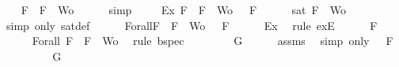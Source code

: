 \begin{isabellebody}
\ \ \isamarkupfalse%
\ {\isachardoublequoteopen}F\ {\isasymin}\ {\isacharbraceleft}F{\isacharbraceright}\ {\isasymunion}\ Wo{\isachardoublequoteclose}\isanewline
\ \ \ \ \isamarkupfalse%
\ simp\ \isanewline
\ \ \isamarkupfalse%
\ Ex{}{\isacharcolon}{\isachardoublequoteopen}{\isasymexists}{\isasymA}{\isachardot}\ {\isasymforall}F\ {\isasymin}\ {\isacharparenleft}{\isacharbraceleft}F{\isacharbraceright}\ {\isasymunion}\ Wo{\isacharparenright}{\isachardot}\ {\isasymA}\ {\isasymTurnstile}\ F{\isachardoublequoteclose}\isanewline
\ \ \ \ \isamarkupfalse%
\ {\isacartoucheopen}sat\ {\isacharparenleft}{\isacharbraceleft}F{\isacharbraceright}\ {\isasymunion}\ Wo{\isacharparenright}{\isacartoucheclose}\ \isamarkupfalse%
\ {\isacharparenleft}simp\ only{\isacharcolon}\ sat{\isacharunderscore}def{\isacharparenright}\isanewline
\ \ \isamarkupfalse%
\ {\isasymA}\ \ Forall{}{\isacharcolon}{\isachardoublequoteopen}{\isasymforall}F\ {\isasymin}\ {\isacharparenleft}{\isacharbraceleft}F{\isacharbraceright}\ {\isasymunion}\ Wo{\isacharparenright}{\isachardot}\ {\isasymA}\ {\isasymTurnstile}\ F{\isachardoublequoteclose}\isanewline
\ \ \ \ \isamarkupfalse%
\ Ex{}\ \isamarkupfalse%
\ {\isacharparenleft}rule\ exE{\isacharparenright}\isanewline
\ \ \isamarkupfalse%
\ {\isachardoublequoteopen}{\isasymA}\ {\isasymTurnstile}\ F{\isachardoublequoteclose}\isanewline
\ \ \ \ \isamarkupfalse%
\ Forall{}\ {\isacartoucheopen}F\ {\isasymin}\ {\isacharbraceleft}F{\isacharbraceright}\ {\isasymunion}\ Wo{\isacartoucheclose}\ \isamarkupfalse%
\ {\isacharparenleft}rule\ bspec{\isacharparenright}\isanewline
\ \ \isamarkupfalse%
\ \isamarkupfalse%
\ {\isachardoublequoteopen}{\isasymA}\ {\isasymTurnstile}\ \isactrlbold {\isasymnot}{\isacharparenleft}\isactrlbold {\isasymnot}\ G{\isacharparenright}{\isachardoublequoteclose}\isanewline
\ \ \ \ \isamarkupfalse%
\ assms{\isacharparenleft}{}{\isacharparenright}\ \isamarkupfalse%
\ {\isacharparenleft}simp\ only{\isacharcolon}\ {\isacartoucheopen}{\isasymA}\ {\isasymTurnstile}\ F{\isacartoucheclose}{\isacharparenright}\isanewline
\ \ \isamarkupfalse%
\ \isamarkupfalse%
\ {\isachardoublequoteopen}{\isasymnot}\ {\isasymA}\ {\isasymTurnstile}\ \isactrlbold {\isasymnot}\ G{\isachardoublequoteclose}\isanewline

\end{isabellebody}
